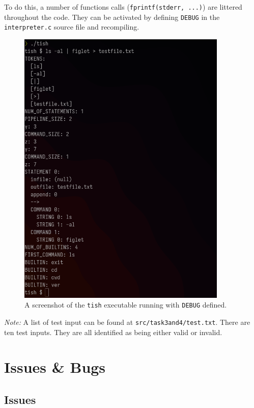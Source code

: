 \documentclass[12pt]{article}
\begin{document}




To do this, a number of functions calls (\texttt{fprintf(stderr,
...)}) are littered throughout the code. They can be activated
by defining \texttt{DEBUG} in the \texttt{interpreter.c} source
file and recompiling.

\begin{figure}[H]
\centering
\includegraphics[width=10cm]{task3and4-test}
\caption{A screenshot of the \texttt{tish} executable running
with \texttt{DEBUG} defined.}
\end{figure}

\textit{Note:} A list of test input can be found at
\texttt{src/task3and4/test.txt}. There are ten test inputs. They
are all identified as being either valid or invalid.

\section{Issues \& Bugs}

\subsection{Issues}
\end{document}
